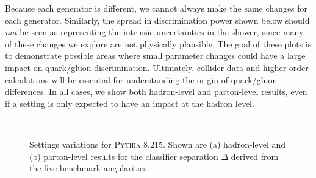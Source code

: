 \documentclass[11pt,letterpaper]{article}
\begin{document}
Because each generator is different, we cannot always make the same changes for each generator.  Similarly, the spread in discrimination power shown below should \emph{not} be seen as representing the intrinsic uncertainties in the shower, since many of these changes we explore are not physically plausible.  The goal of these plots is to demonstrate possible areas where small parameter changes could have a large impact on quark/gluon discrimination.  Ultimately, collider data and higher-order calculations will be essential for understanding the origin of quark/gluon differences.  In all cases, we show both hadron-level and parton-level results, even if a setting is only expected to have an impact at the hadron level.  

\begin{figure}
\centering
{}
$\qquad$
\caption{Settings variations for \textsc{Pythia 8.215}.  Shown are (a) hadron-level and (b) parton-level results for the classifier separation $\Delta$ derived from the five benchmark angularities.}
\label{fig:settings_variation_pythia}
\end{figure}
\end{document}
